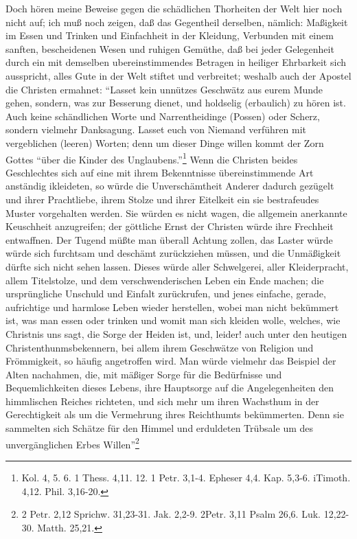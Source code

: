 Doch hören meine Beweise gegen die schädlichen Thorheiten der Welt hier noch
nicht auf; ich muß noch zeigen, daß das Gegentheil derselben, nämlich: Maßigkeit
im Essen und Trinken und Einfachheit in der Kleidung, Verbunden mit einem
sanften, bescheidenen Wesen und ruhigen Gemüthe, daß bei jeder Gelegenheit durch
ein mit demselben ubereinstimmendes Betragen in heiliger Ehrbarkeit sich
ausspricht, alles Gute in der Welt stiftet und verbreitet; weshalb auch der
Apostel die Christen ermahnet: "`Lasset kein unnützes Geschwätz aus eurem Munde
gehen, sondern, was zur Besserung dienet, und holdselig (erbaulich) zu hören
ist. Auch keine schändlichen Worte und Narrentheidinge (Possen) oder Scherz,
sondern vielmehr Danksagung. Lasset euch von Niemand verführen mit vergeblichen
(leeren) Worten; denn um dieser Dinge willen kommt der Zorn Gottes "`über die
Kinder des Unglaubens."'\footnote{Kol. 4, 5. 6. 1  Thess. 4,11. 12. 1 Petr.
3,1-4. Epheser 4,4. Kap. 5,3-6. iTimoth. 4,12. Phil. 3,16-20.} Wenn die Christen
beides Geschlechtes sich auf eine mit ihrem Bekenntnisse übereinstimmende Art
anständig ikleideten, so würde die Unverschämtheit Anderer dadurch gezügelt und
ihrer Prachtliebe, ihrem Stolze und ihrer Eitelkeit ein sie bestrafeudes Muster
vorgehalten werden. Sie würden es nicht wagen, die allgemein anerkannte
Keuschheit anzugreifen; der göttliche Ernst der Christen würde ihre Frechheit
entwaffnen. Der Tugend müßte man überall Achtung zollen, das Laster würde würde
sich furchtsam und deschämt zurückziehen müssen, und die Unmäßigkeit dürfte sich
nicht sehen lassen. Dieses würde aller Schwelgerei, aller Kleiderpracht, allem
Titelstolze, und dem verschwenderischen Leben ein Ende machen; die ursprüngliche
Unschuld und Einfalt zurückrufen, und jenes einfache, gerade, aufrichtige und
harmlose Leben wieder herstellen, wobei man nicht bekümmert ist, was man essen
oder trinken und womit man sich kleiden wolle, welches, wie Christnis uns sagt,
die Sorge der Heiden ist, und, leider! auch unter den heutigen
Christenthunmsbekennern, bei allem ihrem Geschwätze von Religion und
Frömmigkeit, so häufig angetroffen wird. Man würde vielmehr das Beispiel der
Alten nachahmen, die, mit mäßiger Sorge für die Bedürfnisse und Bequemlichkeiten
dieses Lebens, ihre Hauptsorge auf die Angelegenheiten den himmlischen Reiches
richteten, und sich mehr um ihren Wachsthum in der Gerechtigkeit als um die
Vermehrung ihres Reichthumts bekümmerten. Denn sie sammelten sich Schätze für
den Himmel und erduldeten Trübsale um des unvergänglichen Erbes
Willen"'\footnote{2 Petr. 2,12 Sprichw. 31,23-31. Jak. 2,2-9. 2Petr. 3,11 Psalm
26,6. Luk. 12,22-30. Matth. 25,21.}

